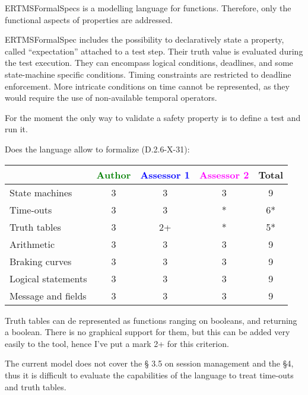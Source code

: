 \begin{author_comment}
ERTMSFormalSpecs is a modelling language for functions. Therefore, only the functional aspects of properties are addressed.  
\end{author_comment}

\begin{assessor1}
ERTMSFormalSpec includes the possibility to declaratively state a property, called "`expectation"' attached to a test step. Their truth value is evaluated during the test execution. They can encompass logical conditions, deadlines, and some state-machine specific conditions. 
Timing constraints are restricted to deadline enforcement. More intricate conditions on time cannot be represented, as they would require the use of non-available temporal operators. 
\end{assessor1}


\begin{assessor2}
For the moment the only way to validate a safety property is to define a test and run it.
\end{assessor2}

Does the language allow to  formalize (D.2.6-X-31):

\begin{tabular}{|l | c | c | c | c|}
\hline
& \textcolor{green}{Author} & \textcolor{blue}{Assessor 1} & \textcolor{magenta}{Assessor 2} & Total \\
\hline 
State machines  & 3 & 3 & 3 & 9 \\
\hline
Time-outs  & 3 & 3 & * & 6*  \\
\hline
Truth tables  & 3 & 2+ & * & 5*  \\
\hline
Arithmetic  & 3 & 3 & 3 & 9  \\
\hline
Braking curves  & 3 & 3 & 3 & 9 \\
\hline
Logical statements & 3 & 3 & 3 & 9  \\
\hline
Message and fields & 3 & 3 & 3 & 9 \\
\hline
\end{tabular}

\begin{assessor1}
Truth tables can de represented as functions ranging on booleans, and returning a boolean. There is no graphical support for them, but this can be added very easily to the tool, hence I've put a mark 2+ for this criterion. 
\end{assessor1}


\begin{assessor2}
The current model does not cover the §  3.5 on session management and the §4, thus it is difficult to evaluate the capabilities of the language to treat time-outs and truth tables.
\end{assessor2}


